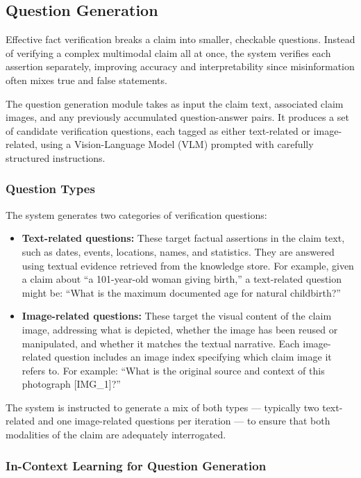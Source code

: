 \subsection{Question Generation}

Effective fact verification breaks a claim into smaller, checkable questions. Instead of verifying a complex multimodal claim all at once, the system verifies each assertion separately, improving accuracy and interpretability since misinformation often mixes true and false statements.

The question generation module takes as input the claim text, associated claim images, and any previously accumulated question-answer pairs. It produces a set of candidate verification questions, each tagged as either text-related or image-related, using a Vision-Language Model (VLM) prompted with carefully structured instructions.

\subsubsection{Question Types}

The system generates two categories of verification questions:

\begin{itemize}
    \item \textbf{Text-related questions:} These target factual assertions in the claim text, such as dates, events, locations, names, and statistics. They are answered using textual evidence retrieved from the knowledge store. For example, given a claim about ``a 101-year-old woman giving birth,'' a text-related question might be: ``What is the maximum documented age for natural childbirth?''
    \item \textbf{Image-related questions:} These target the visual content of the claim image, addressing what is depicted, whether the image has been reused or manipulated, and whether it matches the textual narrative. Each image-related question includes an image index specifying which claim image it refers to. For example: ``What is the original source and context of this photograph [IMG\_1]?''
\end{itemize}

The system is instructed to generate a mix of both types — typically two text-related and one image-related questions per iteration — to ensure that both modalities of the claim are adequately interrogated.

\subsubsection{In-Context Learning for Question Generation}
\label{subsection:icl}

